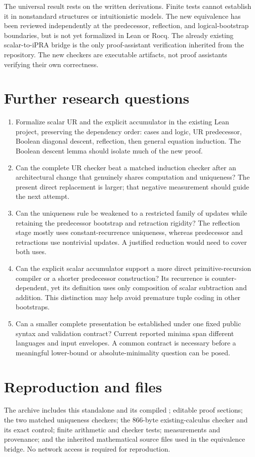 The universal result rests on the written derivations.  Finite tests
cannot establish it in nonstandard structures or intuitionistic models.
The new equivalence has been reviewed independently at the predecessor,
reflection, and logical-bootstrap boundaries, but is not yet formalized
in Lean or Rocq.  The already existing scalar-to-iPRA bridge is the only
proof-assistant verification inherited from the repository.  The new
checkers are executable artifacts, not proof assistants verifying their
own correctness.

\section{Further research questions}
\begin{enumerate}[leftmargin=*]
\item Formalize scalar UR and the explicit accumulator in the existing Lean
project, preserving the dependency order: cases and logic, UR predecessor,
Boolean diagonal descent, reflection, then general equation induction.
The Boolean descent lemma should isolate much of the new proof.
\item Can the complete UR checker beat a matched induction checker after
an architectural change that genuinely shares computation and uniqueness?
The present direct replacement is larger; that negative measurement should
guide the next attempt.
\item Can the uniqueness rule be weakened to a restricted family of
updates while retaining the predecessor bootstrap and retraction rigidity?
The reflection stage mostly uses constant-recurrence uniqueness, whereas
predecessor and retractions use nontrivial updates.  A justified reduction
would need to cover both uses.
\item Can the explicit scalar accumulator support a more direct
primitive-recursion compiler or a shorter predecessor construction?
Its recurrence is counter-dependent, yet its definition uses only
composition of scalar subtraction and addition.  This distinction may
help avoid premature tuple coding in other bootstraps.
\item Can a smaller complete presentation be established under one fixed
public syntax and validation contract?  Current reported minima span
different languages and input envelopes.  A common contract is necessary
before a meaningful lower-bound or absolute-minimality question can be
posed.
\end{enumerate}

\section{Reproduction and files}
The archive includes this standalone  and its compiled
; editable proof sections; the two matched uniqueness
checkers; the 866-byte existing-calculus checker and its exact control;
finite arithmetic and checker tests; measurements and provenance; and
the inherited mathematical source files used in the equivalence bridge.
No network access is required for reproduction.


